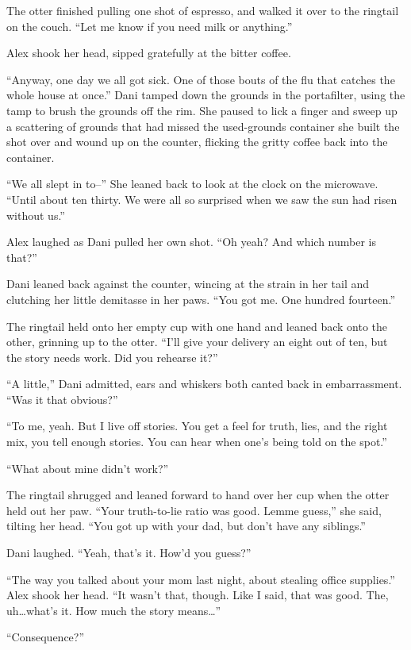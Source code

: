 The otter finished pulling one shot of espresso, and walked it over to the ringtail on the couch. ``Let me know if you need milk or anything.''

Alex shook her head, sipped gratefully at the bitter coffee.

``Anyway, one day we all got sick. One of those bouts of the flu that catches the whole house at once.'' Dani tamped down the grounds in the portafilter, using the tamp to brush the grounds off the rim. She paused to lick a finger and sweep up a scattering of grounds that had missed the used-grounds container she built the shot over and wound up on the counter, flicking the gritty coffee back into the container.

``We all slept in to--'' She leaned back to look at the clock on the microwave. ``Until about ten thirty. We were all so surprised when we saw the sun had risen without us.''

Alex laughed as Dani pulled her own shot. ``Oh yeah? And which number is that?''

Dani leaned back against the counter, wincing at the strain in her tail and clutching her little demitasse in her paws. ``You got me. One hundred fourteen.''

The ringtail held onto her empty cup with one hand and leaned back onto the other, grinning up to the otter. ``I'll give your delivery an eight out of ten, but the story needs work. Did you rehearse it?''

``A little,'' Dani admitted, ears and whiskers both canted back in embarrassment. ``Was it that obvious?''

``To me, yeah. But I live off stories. You get a feel for truth, lies, and the right mix, you tell enough stories. You can hear when one's being told on the spot.''

``What about mine didn't work?''

The ringtail shrugged and leaned forward to hand over her cup when the otter held out her paw. ``Your truth-to-lie ratio was good. Lemme guess,'' she said, tilting her head. ``You got up with your dad, but don't have any siblings.''

Dani laughed. ``Yeah, that's it. How'd you guess?''

``The way you talked about your mom last night, about stealing office supplies.'' Alex shook her head. ``It wasn't that, though. Like I said, that was good. The, uh\ldots{}what's it. How much the story means\ldots{}''

``Consequence?''

